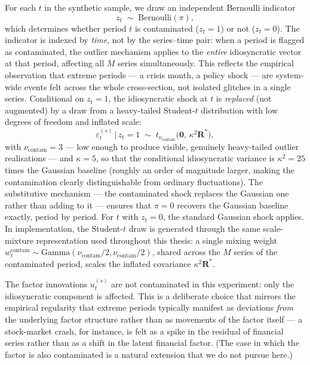 \documentclass[11pt, a4paper, oneside]{article}
\newcommand{\mR}{\mathbf{R}}
\begin{document}
For each $t$ in the synthetic sample, we draw an independent Bernoulli indicator
\[
z_t \;\sim\; \mathrm{Bernoulli}(\pi),
\]
which determines whether period $t$ is contaminated ($z_t = 1$) or
not ($z_t = 0$). The indicator is indexed by \emph{time}, not by
the series--time pair: when a period is flagged as contaminated,
the outlier mechanism applies to the \emph{entire} idiosyncratic
vector at that period, affecting all $M$ series simultaneously.
This reflects the empirical observation that extreme periods ---
a crisis month, a policy shock --- are system-wide events felt
across the whole cross-section, not isolated glitches in a single
series. Conditional on $z_t = 1$, the idiosyncratic shock at $t$
is \emph{replaced} (not augmented) by a draw from a heavy-tailed
Student-$t$ distribution with low degrees of freedom and inflated
scale:
\[
\varepsilon_t^{(s)} \,\big|\, z_t = 1 \;\sim\;
t_{\nu_{\mathrm{contam}}}\!\big(\mathbf{0},\, \kappa^2 \mR^*\big),
\]
with $\nu_{\mathrm{contam}} = 3$ --- low enough to produce
visible, genuinely heavy-tailed outlier realisations --- and
$\kappa = 5$, so that the conditional idiosyncratic variance is
$\kappa^2 = 25$ times the Gaussian baseline (roughly an order of
magnitude larger, making the contamination clearly distinguishable
from ordinary fluctuations). The substitutive mechanism --- the
contaminated shock replaces the Gaussian one rather than adding to
it --- ensures that $\pi = 0$ recovers the Gaussian baseline
exactly, period by period. For $t$ with $z_t = 0$, the standard
Gaussian shock applies. In implementation, the Student-$t$ draw is
generated through the same scale-mixture representation used
throughout this thesis: a single mixing weight
$w_t^{\mathrm{contam}} \sim \mathrm{Gamma}(\nu_{\mathrm{contam}}/2,
\nu_{\mathrm{contam}}/2)$, shared across the $M$ series of the
contaminated period, scales the inflated covariance
$\kappa^2 \mR^*$.

The factor innovations $u_t^{(s)}$ are not contaminated in this
experiment: only the idiosyncratic component is affected. This is
a deliberate choice that mirrors the empirical regularity that
extreme periods typically manifest as deviations \emph{from} the
underlying factor structure rather than as movements of the
factor itself — a stock-market crash, for instance, is felt as a
spike in the residual of financial series rather than as a shift
in the latent financial factor. (The case in which the factor is
also contaminated is a natural extension that we do not pursue
here.)
\end{document}
